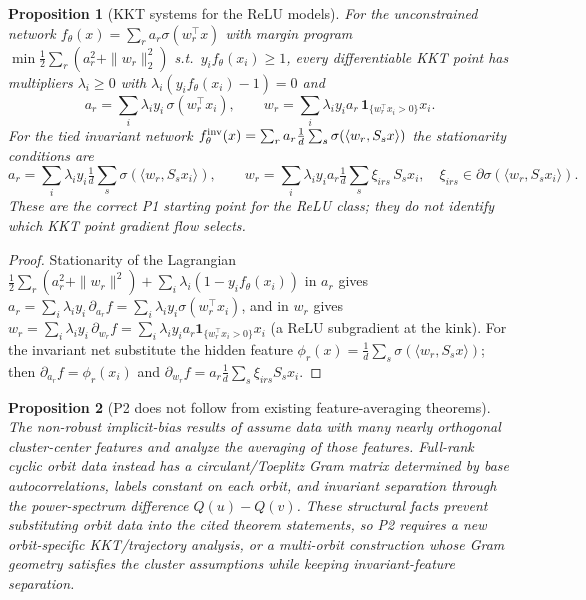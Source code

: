 \documentclass[11pt]{article}
\theoremstyle{plain}
\newtheorem{proposition}{Proposition}
\theoremstyle{definition}
\theoremstyle{remark}
\begin{document}
\begin{proposition}[KKT systems for the ReLU models]\label{prop:kkt-systems}
For the unconstrained network $f_\theta(x)=\sum_r a_r\sigma(w_r^\top x)$ with margin program $\min\tfrac12\sum_r(a_r^2+\|w_r\|_2^2)$ s.t.\ $y_if_\theta(x_i)\ge1$, every differentiable KKT point has multipliers $\lambda_i\ge0$ with $\lambda_i(y_if_\theta(x_i)-1)=0$ and
\[
a_r=\sum_i\lambda_i y_i\,\sigma(w_r^\top x_i),\qquad
w_r=\sum_i\lambda_i y_i a_r\,\mathbf 1_{\{w_r^\top x_i>0\}}x_i.
\]
For the tied invariant network $f_\theta^{\rm inv}(x)=\sum_r a_r\frac1d\sum_s\sigma(\langle w_r,S_sx\rangle)$ the stationarity conditions are
\[
a_r=\sum_i\lambda_i y_i\tfrac1d\sum_s\sigma(\langle w_r,S_sx_i\rangle),\qquad
w_r=\sum_i\lambda_i y_i a_r\tfrac1d\sum_s\xi_{irs}\,S_sx_i,\quad \xi_{irs}\in\partial\sigma(\langle w_r,S_sx_i\rangle).
\]
These are the correct P1 starting point for the ReLU class; they do not identify which KKT point gradient flow selects.
\end{proposition}
\begin{proof}
Stationarity of the Lagrangian $\tfrac12\sum_r(a_r^2+\|w_r\|^2)+\sum_i\lambda_i(1-y_if_\theta(x_i))$ in $a_r$ gives $a_r=\sum_i\lambda_i y_i\,\partial_{a_r}f=\sum_i\lambda_i y_i\sigma(w_r^\top x_i)$, and in $w_r$ gives $w_r=\sum_i\lambda_i y_i\,\partial_{w_r}f=\sum_i\lambda_i y_i a_r\mathbf 1_{\{w_r^\top x_i>0\}}x_i$ (a ReLU subgradient at the kink).  For the invariant net substitute the hidden feature $\phi_r(x)=\frac1d\sum_s\sigma(\langle w_r,S_sx\rangle)$; then $\partial_{a_r}f=\phi_r(x_i)$ and $\partial_{w_r}f=a_r\frac1d\sum_s\xi_{irs}S_sx_i$.
\end{proof}

\begin{proposition}[P2 does not follow from existing feature-averaging theorems]\label{prop:p2-not-transfer}
The non-robust implicit-bias results of \citet{Frei2023,LiFeature2024} assume data with many nearly orthogonal cluster-center features and analyze the averaging of those features.  Full-rank cyclic orbit data instead has a circulant/Toeplitz Gram matrix determined by base autocorrelations, labels constant on each orbit, and invariant separation through the power-spectrum difference $Q(u)-Q(v)$.  These structural facts prevent substituting orbit data into the cited theorem statements, so P2 requires a new orbit-specific KKT/trajectory analysis, or a multi-orbit construction whose Gram geometry satisfies the cluster assumptions while keeping invariant-feature separation.
\end{proposition}
\end{document}
